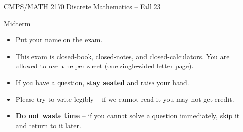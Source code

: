 \documentclass[11pt]{article}
\def\ni{\noindent}
\def\ontest#1{#1}
\def\solution#1{}
\begin{document}
\begin{center}{\Large CMPS/MATH 2170 Discrete Mathematics -- Fall 23}\end{center}
\begin{center}{\huge Midterm}\end{center} 
\flushleft

\ontest{
\vspace*{2cm}
\flushleft{}
\hspace*{3cm}{\bf\huge Name:}
\vspace*{2cm}
%
\ni
\begin{itemize}
\item Put your name on the exam.
\item This exam is closed-book, closed-notes, and closed-calculators. You are allowed to use a helper sheet (one single-sided letter page).
\item If you have a question, {\bf stay seated} and raise your hand.
\item Please try to write legibly -- if we cannot read it you may not get
  credit.
\item {\bf Do not waste time} -- if you cannot solve a question immediately, skip
  it and return to it later. 
\end{itemize}
}%

\solution{
\vspace*{4cm}
\begin{center}
\vspace*{2cm}
\end{center}
}
\end{document}
